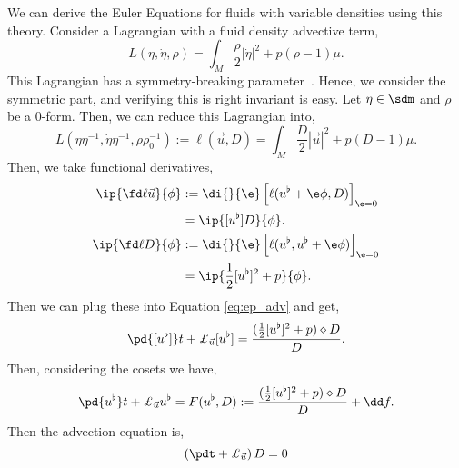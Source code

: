 \noindent
We can derive the Euler Equations for fluids with variable densities using this theory. Consider a Lagrangian with a fluid density advective term,
$$ L(\eta, \dot\eta, \rho) = \int_M \frac{\rho}{2}|\dot \eta|^2 + p(\rho - 1)\mu. $$
This Lagrangian has a symmetry-breaking parameter~\cite{arthur}. Hence, we consider the symmetric part, and verifying this is right invariant is easy. Let $\eta \in \sdm$ and $\rho$ be a $0$-form. Then, we can reduce this Lagrangian into,
$$ L(\eta\eta^{-1}, \dot\eta\eta^{-1}, \rho\rho_0^{-1}) := \ell(\vec u, D) = \int_M \frac{D}{2}|\vec u|^2 + p(D-1) \mu. $$
Then, we take functional derivatives,
\begin{align*}
  \ip{\fd \ell {\vec u}}{\phi} &:= \di{}{\e} \left[ \ell(u^\flat + \e \phi, D) \right]_{\e = 0} \\
  &= \ip{[u^\flat]D}{\phi}.\\
  \ip{\fd \ell D}{\phi} &:= \di{}{\e} \left[ \ell(u^\flat, u^\flat + \e \phi) \right]_{\e = 0} \\
  &= \ip{\frac{1}{2}[u^\flat]^2 + p}{\phi}.
\end{align*}
Then we can plug these into Equation \eqref{eq:ep_adv} and get,
$$ \pd {[u^\flat]} t + \pounds_{\vec u} [u^\flat] = \frac{(\frac{1}{2}[u^\flat]^2 + p) \diamond D}{D}. $$
Then, considering the cosets we have,
$$ \pd {u^\flat} t + \pounds_{\vec u} u^\flat = F(u^\flat, D) := \frac{(\frac{1}{2}[u^\flat]^2 + p) \diamond D}{D} + \dd f. $$
Then the advection equation is,
$$ \left( \pdt + \pounds_{\vec u} \right)D = 0 $$



